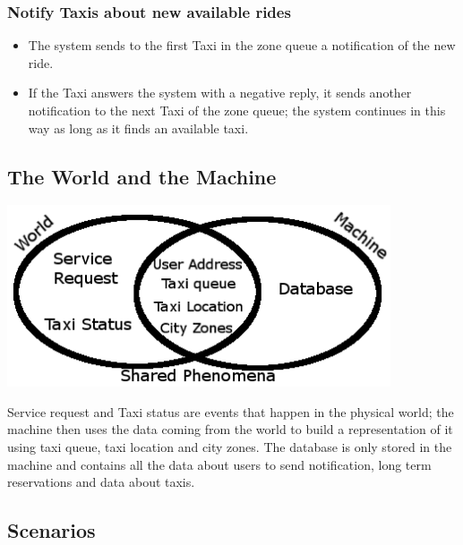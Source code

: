 		\subsubsection{Notify Taxis about new available rides}
		\begin{itemize}
			\item The system sends to the first Taxi in the zone queue a notification of the new ride.
			\item If the Taxi answers the system with a negative reply, it sends another notification to the next Taxi of the zone queue; the system continues in this way as long as it finds an available taxi. 
		\end{itemize}
		\subsection{The World and the Machine}
		\begin{center}
			\includegraphics[width=0.85\textwidth]{./images/ellissi}
		\end{center}
		Service request and Taxi status are events that happen in the physical world; the machine then uses the data coming from the world to build a representation of it using taxi queue, taxi location and city zones. The database is only stored in the machine and contains all the data about users to send notification, long term reservations and data about taxis.
	\subsection{Scenarios}
